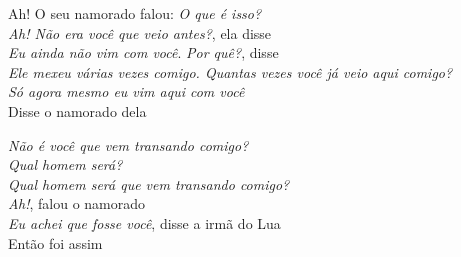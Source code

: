 \begin{linenumbers}\begingroup\raggedright
\noindent Ah! O seu namorado falou: \emph{O que é isso?}\\
\emph{Ah! Não era você que veio antes?}, ela disse\\
\emph{Eu ainda não vim com você}. \emph{Por quê?}, disse\\
\emph{Ele mexeu várias vezes comigo. Quantas vezes você já veio aqui comigo?}\\
\emph{Só agora mesmo eu vim aqui com você}\\
Disse o namorado dela
\end{linenumbers}\endgroup

\bigskip

\begin{linenumbers}\begingroup\raggedright
\noindent \emph{Não é você que vem transando comigo?}\\
\emph{Qual homem será?}\\
\emph{Qual homem será que vem transando comigo?}\\
\emph{Ah!}, falou o namorado\\
\emph{Eu achei que fosse você}, disse a irmã do Lua\\
Então foi assim
\end{linenumbers}\endgroup

\bigskip

